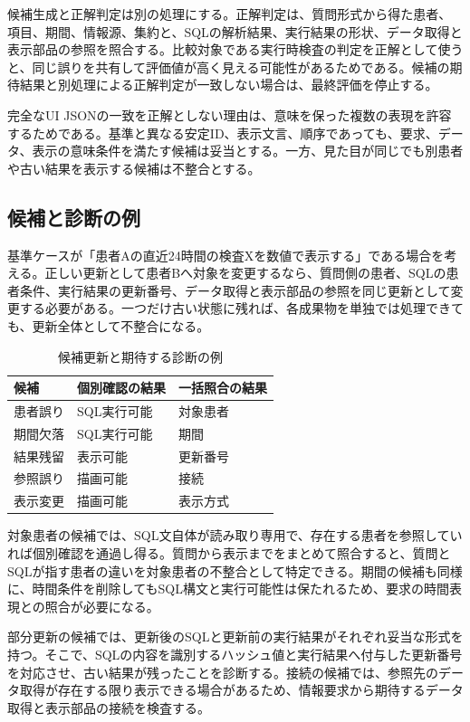 \documentclass[a4paper]{jsarticle}
\begin{document}
候補生成と正解判定は別の処理にする。正解判定は、質問形式から得た患者、項目、期間、情報源、集約と、SQLの解析結果、実行結果の形状、データ取得と表示部品の参照を照合する。比較対象である実行時検査の判定を正解として使うと、同じ誤りを共有して評価値が高く見える可能性があるためである。候補の期待結果と別処理による正解判定が一致しない場合は、最終評価を停止する。

完全なUI JSONの一致を正解としない理由は、意味を保った複数の表現を許容するためである。基準と異なる安定ID、表示文言、順序であっても、要求、データ、表示の意味条件を満たす候補は妥当とする。一方、見た目が同じでも別患者や古い結果を表示する候補は不整合とする。

\subsection{候補と診断の例}

基準ケースが「患者Aの直近24時間の検査Xを数値で表示する」である場合を考える。正しい更新として患者Bへ対象を変更するなら、質問側の患者、SQLの患者条件、実行結果の更新番号、データ取得と表示部品の参照を同じ更新として変更する必要がある。一つだけ古い状態に残れば、各成果物を単独では処理できても、更新全体として不整合になる。

\begin{table}[t]
  \centering
  \setlength{\tabcolsep}{2.5pt}
  \caption{候補更新と期待する診断の例}
  \label{tab:diagnosis-examples}
  \begin{tabular}{L{0.23\columnwidth}L{0.34\columnwidth}L{0.25\columnwidth}}
    \toprule
    候補 & 個別確認の結果 & 一括照合の結果 \\
    \midrule
    患者誤り & SQL実行可能 & 対象患者 \\
    期間欠落 & SQL実行可能 & 期間 \\
    結果残留 & 表示可能 & 更新番号 \\
    参照誤り & 描画可能 & 接続 \\
    表示変更 & 描画可能 & 表示方式 \\
    \bottomrule
  \end{tabular}
\end{table}

対象患者の候補では、SQL文自体が読み取り専用で、存在する患者を参照していれば個別確認を通過し得る。質問から表示までをまとめて照合すると、質問とSQLが指す患者の違いを対象患者の不整合として特定できる。期間の候補も同様に、時間条件を削除してもSQL構文と実行可能性は保たれるため、要求の時間表現との照合が必要になる。

部分更新の候補では、更新後のSQLと更新前の実行結果がそれぞれ妥当な形式を持つ。そこで、SQLの内容を識別するハッシュ値と実行結果へ付与した更新番号を対応させ、古い結果が残ったことを診断する。接続の候補では、参照先のデータ取得が存在する限り表示できる場合があるため、情報要求から期待するデータ取得と表示部品の接続を検査する。
\end{document}
